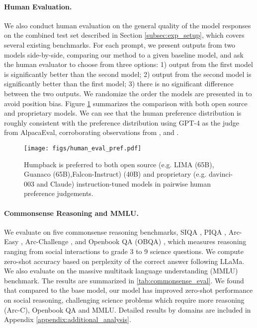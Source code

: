 \paragraph{Human Evaluation.} We also conduct human evaluation on the general quality of the model responses on the combined test set described in Section \ref{subsec:exp_setup}, which covers several existing benchmarks. For each prompt, we present outputs from two models side-by-side, comparing our method to a given baseline model, and ask the human evaluator to choose from three options: 1) output from the first model is significantly better than the second model; 2) output from the second model is significantly better than the first model; 3) there is no significant difference between the two outputs. We randomize the order the models are presented in to avoid position bias. Figure \ref{fig:human_eval_pref} summarizes the comparison with both open source and proprietary models. We can see that the human preference distribution is roughly consistent with the preference distribution using GPT-4 as the judge from AlpacaEval, corroborating observations from \citet{alpaca_eval}, \citet{zhou2023lima} and \citet{zheng2023judging}.  

\begin{figure}
  \centering
  \texttt{[image: figs/human\_eval\_pref.pdf]}
  \caption{Humpback is preferred to both open source (e.g. LIMA\citep{zhou2023lima} (65B), Guanaco \citep{dettmers2023qlora} (65B),Falcon-Instruct\citep{falcon40b}) (40B) and proprietary (e.g. davinci-003\citep{ouyang2022training} and Claude\citep{bai2022training}) instruction-tuned models in pairwise human preference judgements.}
  \label{fig:human_eval_pref}
  \vspace{-3mm}
\end{figure}

\paragraph{Commonsense Reasoning and MMLU.} We evaluate on five commonsense reasoning benchmarks, SIQA 
\citep{sap2019socialiqa}, PIQA \citep{bisk2020piqa}, Arc-Easy \citep{clark2018think}, Arc-Challenge \citep{clark2018think}, and Openbook QA (OBQA) \citep{mihaylov2018can}, which measures reasoning ranging from social interactions to grade 3 to 9 science questions. We compute zero-shot accuracy based on perplexity of the correct answer following LLaMa\citep{touvron2023llama}. We also evaluate on the  massive multitask language understanding (MMLU) \citep{hendrycks2020measuring} benchmark. The results are summarized in \autoref{tab:commonsense_eval}. We found that compared to the base model, our model has improved zero-shot performance on social reasoning, challenging science problems which require more reasoning (Arc-C),  Openbook QA and MMLU. Detailed results by domains are included in Appendix \ref{appendix:additional_analysis}.

